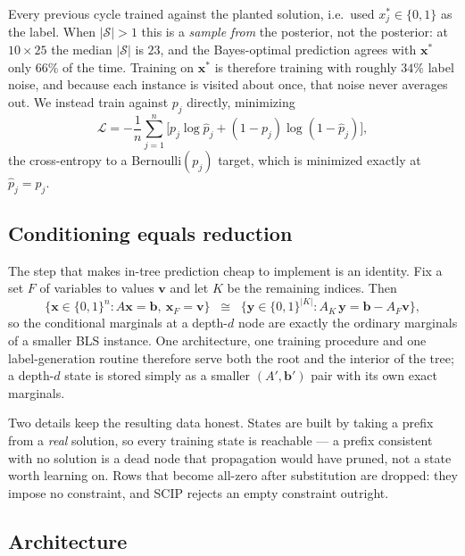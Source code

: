 \documentclass[12pt]{article}
\begin{document}
Every previous cycle trained against the planted solution, i.e.\ used $x^\ast_j\in\{0,1\}$ as the label. When $|\mathcal{S}|>1$ this is a \emph{sample from} the posterior, not the posterior: at $10\times25$ the median $|\mathcal{S}|$ is $23$, and the Bayes-optimal prediction agrees with $\mathbf{x}^\ast$ only $66\%$ of the time. Training on $\mathbf{x}^\ast$ is therefore training with roughly $34\%$ label noise, and because each instance is visited about once, that noise never averages out. We instead train against $p_j$ directly, minimizing
\begin{equation}
\mathcal{L} = -\frac{1}{n}\sum_{j=1}^{n}\Big[p_j\log \hat{p}_j+(1-p_j)\log(1-\hat{p}_j)\Big],
\end{equation}
the cross-entropy to a Bernoulli$(p_j)$ target, which is minimized exactly at $\hat{p}_j=p_j$.

\subsection{Conditioning equals reduction}
\label{sec:m-reduce}

The step that makes in-tree prediction cheap to implement is an identity. Fix a set $F$ of variables to values $\mathbf{v}$ and let $K$ be the remaining indices. Then
\begin{equation}
\{\mathbf{x}\in\{0,1\}^n : A\mathbf{x}=\mathbf{b},\ \mathbf{x}_F=\mathbf{v}\}
\;\;\cong\;\;
\{\mathbf{y}\in\{0,1\}^{|K|} : A_K\,\mathbf{y}=\mathbf{b}-A_F\mathbf{v}\},
\label{eq:reduce}
\end{equation}
so the conditional marginals at a depth-$d$ node are exactly the ordinary marginals of a smaller BLS instance. One architecture, one training procedure and one label-generation routine therefore serve both the root and the interior of the tree; a depth-$d$ state is stored simply as a smaller $(A',\mathbf{b}')$ pair with its own exact marginals.

Two details keep the resulting data honest. States are built by taking a prefix from a \emph{real} solution, so every training state is reachable --- a prefix consistent with no solution is a dead node that propagation would have pruned, not a state worth learning on. Rows that become all-zero after substitution are dropped: they impose no constraint, and SCIP rejects an empty constraint outright.

\subsection{Architecture}
\label{sec:m-arch}
\end{document}
